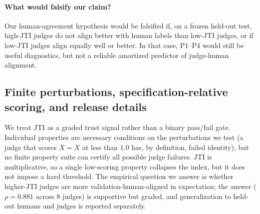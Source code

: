 \documentclass{article}
\begin{document}
\paragraph{What would falsify our claim?}
Our human-agreement hypothesis would be falsified if, on a frozen held-out test, high-JTI judges do not align better with human labels than low-JTI judges, or if low-JTI judges align equally well or better.
In that case, P1--P4 would still be useful diagnostics, but not a reliable amortized predictor of judge-human alignment.

\subsection{Finite perturbations, specification-relative scoring, and release details}
We treat JTI as a graded trust signal rather than a binary pass/fail gate.
Individual properties are necessary conditions on the perturbations we test (a judge that scores \(X=X\) at less than \(1.0\) has, by definition, failed identity), but no finite property suite can certify all possible judge failures.
JTI is multiplicative, so a single low-scoring property collapses the index, but it does not impose a hard threshold.
The empirical question we answer is whether higher-JTI judges are more validation-human-aligned in expectation; the answer (\(\rho=0.881\) across \(8\) judges) is supportive but graded, and generalization to held-out humans and judges is reported separately.
\end{document}
